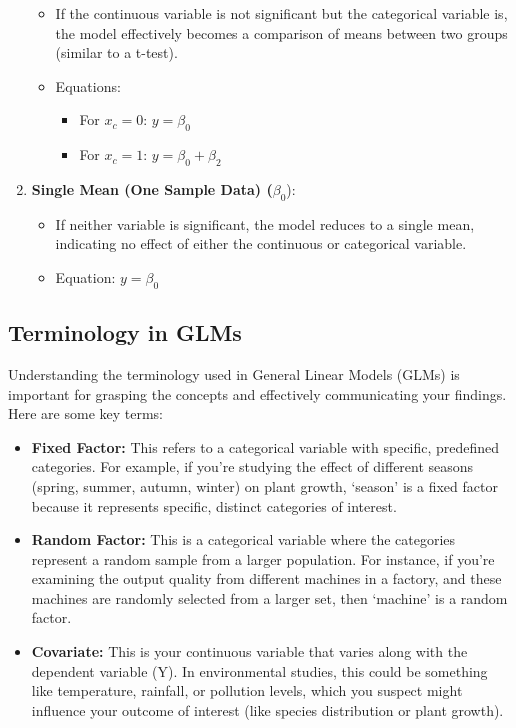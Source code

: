 \documentclass[
  letterpaper,
  DIV=11,
  numbers=noendperiod]{scrreprt}
\providecommand{\tightlist}{%
  \setlength{\itemsep}{0pt}\setlength{\parskip}{0pt}}\usepackage{longtable,booktabs,array}
\begin{document}
\begin{enumerate}
  \begin{itemize}
  \tightlist
  \item
    If the continuous variable is not significant but the categorical
    variable is, the model effectively becomes a comparison of means
    between two groups (similar to a t-test).
  \item
    Equations:

    \begin{itemize}
    \tightlist
    \item
      For \(x_c = 0\): \(y = \beta_0\)
    \item
      For \(x_c = 1\): \(y = \beta_0 + \beta_2\)
    \end{itemize}
  \end{itemize}
\item
  \textbf{Single Mean (One Sample Data) (}\(\beta_0\)):

  \begin{itemize}
  \tightlist
  \item
    If neither variable is significant, the model reduces to a single
    mean, indicating no effect of either the continuous or categorical
    variable.
  \item
    Equation: \(y = \beta_0\)
  \end{itemize}
\end{enumerate}

\subsection{Terminology in GLMs}\label{terminology-in-glms}

Understanding the terminology used in General Linear Models (GLMs) is
important for grasping the concepts and effectively communicating your
findings. Here are some key terms:

\begin{itemize}
\item
  \textbf{Fixed Factor:} This refers to a categorical variable with
  specific, predefined categories. For example, if you're studying the
  effect of different seasons (spring, summer, autumn, winter) on plant
  growth, `season' is a fixed factor because it represents specific,
  distinct categories of interest.
\item
  \textbf{Random Factor:} This is a categorical variable where the
  categories represent a random sample from a larger population. For
  instance, if you're examining the output quality from different
  machines in a factory, and these machines are randomly selected from a
  larger set, then `machine' is a random factor.
\item
  \textbf{Covariate:} This is your continuous variable that varies along
  with the dependent variable (Y). In environmental studies, this could
  be something like temperature, rainfall, or pollution levels, which
  you suspect might influence your outcome of interest (like species
  distribution or plant growth).
\end{itemize}
\end{document}
